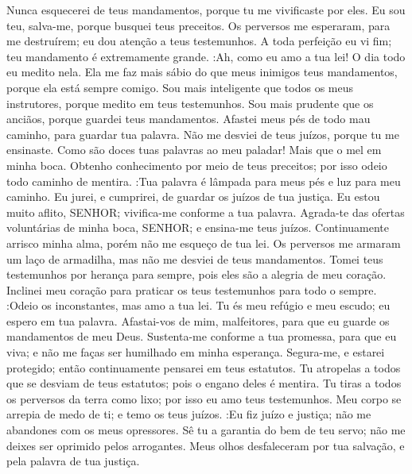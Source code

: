 {Nunca esquecerei de teus mandamentos, porque tu me vivificaste por eles.
Eu sou teu, salva-me, porque busquei teus preceitos.
Os perversos me esperaram, para me destruírem;
{} eu dou atenção a teus testemunhos.
A toda perfeição eu vi fim;
{} teu mandamento é extremamente grande.
 :Ah, como eu amo a tua lei! O dia todo eu medito nela.
Ela me faz mais sábio do que meus inimigos
{} teus mandamentos, porque ela está sempre comigo.
Sou mais inteligente que todos os meus instrutores, porque medito em teus testemunhos.
Sou mais prudente que os anciãos, porque guardei teus mandamentos.
Afastei meus pés de todo mau caminho, para guardar tua palavra.
Não me desviei de teus juízos, porque tu me ensinaste.
Como são doces tuas palavras ao meu paladar! Mais que o mel em minha boca.
Obtenho conhecimento por meio de teus preceitos; por isso odeio todo caminho de mentira.
 :Tua palavra é lâmpada para meus pés e luz para meu caminho.
Eu jurei, e
{} cumprirei, de guardar os juízos de tua justiça.
Eu estou muito aflito, SENHOR; vivifica-me conforme a tua palavra.
Agrada-te das ofertas voluntárias de minha boca, SENHOR; e ensina-me teus juízos.
Continuamente arrisco minha alma, porém não me esqueço de tua lei.
Os perversos me armaram um laço de armadilha, mas não me desviei de teus mandamentos.
Tomei teus testemunhos por herança para sempre, pois eles são a alegria de meu coração.
Inclinei meu coração para praticar os teus testemunhos para todo o sempre.
 :Odeio os inconstantes, mas amo a tua lei.
Tu és meu refúgio e meu escudo; eu espero em tua palavra.
Afastai-vos de mim, malfeitores, para que eu guarde os mandamentos de meu Deus.
Sustenta-me conforme a tua promessa, para que eu viva; e não me faças ser humilhado em minha esperança.
Segura-me, e estarei protegido; então continuamente pensarei em teus estatutos.
Tu atropelas a todos que se desviam de teus estatutos; pois o engano deles é mentira.
Tu tiras a todos os perversos da terra como
{} lixo; por isso eu amo teus testemunhos.
Meu corpo se arrepia de medo de ti; e temo os teus juízos.
 :Eu fiz juízo e justiça; não me abandones com os meus opressores.
Sê tu a garantia do bem de teu servo; não me deixes ser oprimido pelos arrogantes.
Meus olhos desfaleceram
{} por tua salvação, e pela palavra de tua justiça.
}
